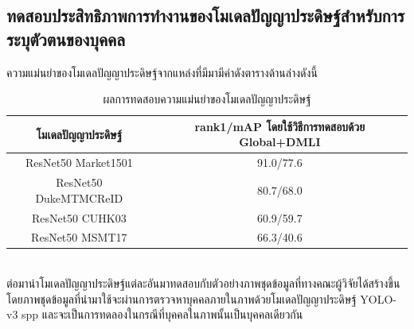 \subsection{ทดสอบประสิทธิภาพการทำงานของโมเดลปัญญาประดิษฐ์สำหรับการระบุตัวตนของบุคคล}
\label{sec:reid_ex}
ความแม่นยำของโมเดลปัญญาประดิษฐ์จากแหล่งที่มีมามีค่าดังตารางด้านล่างดังนี้
\begin{table}[!ht]
    \centering
    \begin{tabular}{|c|c|}
            \hline
            {โมเดลปัญญาประดิษฐ์}&{rank1/mAP โดยใช้วิธีการทดสอบด้วย Global+DMLI}				\\
            \hline
            ResNet50 Market1501	 			& 91.0/77.6								\\
            ResNet50 DukeMTMCReID			& 80.7/68.0								\\
            ResNet50 CUHK03				& 60.9/59.7								\\
            ResNet50 MSMT17				& 66.3/40.6								\\
        \hline
    \end{tabular}
    \caption{ผลการทดสอบความแม่นยำของโมเดลปัญญาประดิษฐ์}
    \label{tab: Accuracy of model ReID}
\end{table}
\\
ต่อมานำโมเดลปัญญาประดิษฐ์แต่ละอันมาทดสอบกับตัวอย่างภาพชุดข้อมูลที่ทางคณะผู้วิจัยได้สร้างขึ้น โดยภาพชุดข้อมูลที่นำมาใช้จะผ่านการตรวจหาบุคคลภายในภาพด้วยโมเดลปัญญาประดิษฐ์ YOLO-v3 spp และจะเป็นการทดลองในกรณีที่บุคคลในภาพนั้นเป็นบุคคลเดียวกัน
